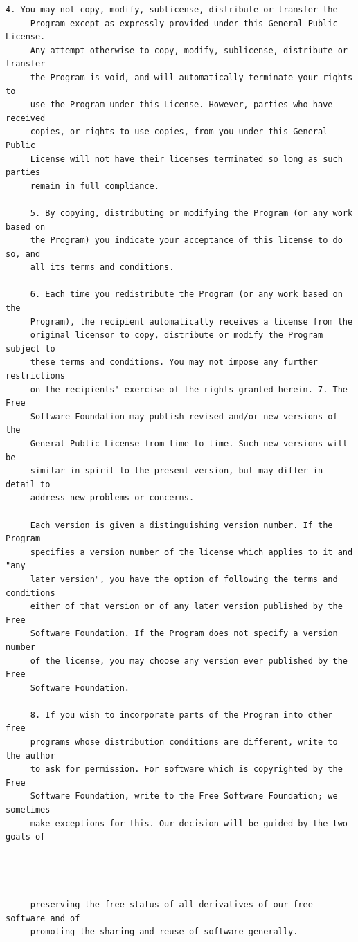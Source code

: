 \begin{lstlisting}[basicstyle=\ttfamily\footnotesize,breaklines=true]
     4. You may not copy, modify, sublicense, distribute or transfer the
     Program except as expressly provided under this General Public License.
     Any attempt otherwise to copy, modify, sublicense, distribute or transfer
     the Program is void, and will automatically terminate your rights to
     use the Program under this License. However, parties who have received
     copies, or rights to use copies, from you under this General Public
     License will not have their licenses terminated so long as such parties
     remain in full compliance.

     5. By copying, distributing or modifying the Program (or any work based on
     the Program) you indicate your acceptance of this license to do so, and
     all its terms and conditions.

     6. Each time you redistribute the Program (or any work based on the
     Program), the recipient automatically receives a license from the
     original licensor to copy, distribute or modify the Program subject to
     these terms and conditions. You may not impose any further restrictions
     on the recipients' exercise of the rights granted herein. 7. The Free
     Software Foundation may publish revised and/or new versions of the
     General Public License from time to time. Such new versions will be
     similar in spirit to the present version, but may differ in detail to
     address new problems or concerns.

     Each version is given a distinguishing version number. If the Program
     specifies a version number of the license which applies to it and "any
     later version", you have the option of following the terms and conditions
     either of that version or of any later version published by the Free
     Software Foundation. If the Program does not specify a version number
     of the license, you may choose any version ever published by the Free
     Software Foundation.

     8. If you wish to incorporate parts of the Program into other free
     programs whose distribution conditions are different, write to the author
     to ask for permission. For software which is copyrighted by the Free
     Software Foundation, write to the Free Software Foundation; we sometimes
     make exceptions for this. Our decision will be guided by the two goals of




     preserving the free status of all derivatives of our free software and of
     promoting the sharing and reuse of software generally.


\end{lstlisting}
